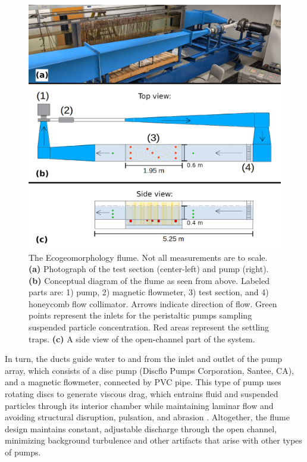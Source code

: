 \documentclass[geosciences,article,submit,moreauthors,pdftex]{Definitions/mdpi}
\begin{document}
\begin{figure}[h]
\includegraphics[width=5in]{../pics/flume_with_sedtraps.png}
\centering
\caption{The Ecogeomorphology flume. Not all measurements are to scale. \textbf{(a)} Photograph of the test section (center-left) and pump (right). \textbf{(b)} Conceptual diagram of the flume as seen from above. Labeled parts are: 1) pump, 2) magnetic flowmeter, 3) test section, and 4) honeycomb flow collimator. Arrows indicate direction of flow. Green points represent the inlets for the peristaltic pumps sampling suspended particle concentration. Red areas represent the settling traps. \textbf{(c)} A side view of the open-channel part of the system.}
\label{fig:floorplan}
\end{figure}

In turn, the ducts guide water to and from the inlet and outlet of the pump array, which consists of a disc pump (Discflo Pumps Corporation, Santee, CA), and a magnetic flowmeter, connected by PVC pipe. This type of pump uses rotating discs to generate viscous drag, which entrains fluid and suspended particles through its interior chamber while maintaining laminar flow and avoiding structural disruption, pulsation, and abrasion \cite{discflo}. Altogether, the flume design maintains constant, adjustable discharge through the open channel, minimizing background turbulence and other artifacts that arise with other types of pumps.
\end{document}
